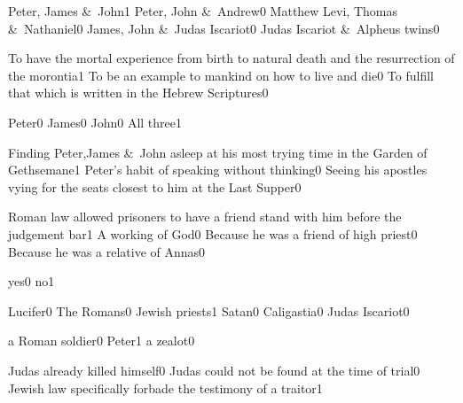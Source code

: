 {Peter, James \&\ John}{1}
{Peter, John \&\ Andrew}{0}
{Matthew Levi, Thomas \&\ Nathaniel}{0}
{James, John \&\ Judas Iscariot}{0}
{Judas Iscariot \&\ Alpheus twins}{0}
\qstop

{To have the mortal experience from birth to natural death and the resurrection of the morontia}{1}
{To be an example to mankind on how to live and die}{0}
{To fulfill that which is written in the Hebrew Scriptures}{0}
\qstop

{Peter}{0}
{James}{0}
{John}{0}
{All three}{1}
\qstop

{Finding Peter,James \&\ John asleep at his most trying time in the Garden of Gethsemane}{1}
{Peter's habit of speaking without thinking}{0}
{Seeing his apostles vying for the seats closest to him at the Last Supper}{0}
\qstop


{Roman law allowed prisoners to have a friend stand with him before the judgement bar}{1}
{A working of God}{0}
{Because he was a friend of high priest}{0}
{Because he was a relative of Annas}{0}
\qstop

{yes}{0}
{no}{1}
\qstop

{Lucifer}{0}
{The Romans}{0}
{Jewish priests}{1}
{Satan}{0}
{Caligastia}{0}
{Judas Iscariot}{0}
\qstop

{a Roman soldier}{0}
{Peter}{1}
{a zealot}{0}
\qstop


{Judas already killed himself}{0}
{Judas could not be found at the time of trial}{0}
{Jewish law specifically forbade the testimony of a traitor}{1}
\qstop

